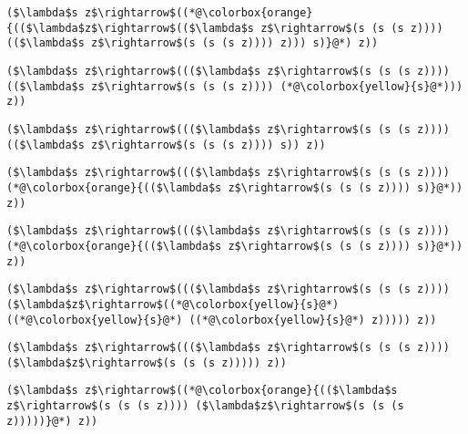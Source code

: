 \documentclass{beamer}
\begin{document}
\begin{frame}[fragile]{\CurrentSection}
\lstset{basicstyle=\ttfamily\small}\lstset{numbers=none}\lstset{language=ML}\begin{lstlisting}
($\lambda$s z$\rightarrow$((*@\colorbox{orange}{(($\lambda$z$\rightarrow$(($\lambda$s z$\rightarrow$(s (s (s z)))) (($\lambda$s z$\rightarrow$(s (s (s z)))) z))) s)}@*) z))
\end{lstlisting}
\pause\lstset{language=ML}\begin{lstlisting}
($\lambda$s z$\rightarrow$((($\lambda$s z$\rightarrow$(s (s (s z)))) (($\lambda$s z$\rightarrow$(s (s (s z)))) (*@\colorbox{yellow}{s}@*))) z))
\end{lstlisting}

\end{frame}

\begin{frame}[fragile]{\CurrentSection}
\lstset{basicstyle=\ttfamily\small}\lstset{numbers=none}\lstset{language=ML}\begin{lstlisting}
($\lambda$s z$\rightarrow$((($\lambda$s z$\rightarrow$(s (s (s z)))) (($\lambda$s z$\rightarrow$(s (s (s z)))) s)) z))
\end{lstlisting}
\pause\lstset{language=ML}\begin{lstlisting}
($\lambda$s z$\rightarrow$((($\lambda$s z$\rightarrow$(s (s (s z)))) (*@\colorbox{orange}{(($\lambda$s z$\rightarrow$(s (s (s z)))) s)}@*)) z))
\end{lstlisting}

\end{frame}

\begin{frame}[fragile]{\CurrentSection}
\lstset{basicstyle=\ttfamily\small}\lstset{numbers=none}\lstset{language=ML}\begin{lstlisting}
($\lambda$s z$\rightarrow$((($\lambda$s z$\rightarrow$(s (s (s z)))) (*@\colorbox{orange}{(($\lambda$s z$\rightarrow$(s (s (s z)))) s)}@*)) z))
\end{lstlisting}
\pause\lstset{language=ML}\begin{lstlisting}
($\lambda$s z$\rightarrow$((($\lambda$s z$\rightarrow$(s (s (s z)))) ($\lambda$z$\rightarrow$((*@\colorbox{yellow}{s}@*) ((*@\colorbox{yellow}{s}@*) ((*@\colorbox{yellow}{s}@*) z))))) z))
\end{lstlisting}

\end{frame}

\begin{frame}[fragile]{\CurrentSection}
\lstset{basicstyle=\ttfamily\small}\lstset{numbers=none}\lstset{language=ML}\begin{lstlisting}
($\lambda$s z$\rightarrow$((($\lambda$s z$\rightarrow$(s (s (s z)))) ($\lambda$z$\rightarrow$(s (s (s z))))) z))
\end{lstlisting}
\pause\lstset{language=ML}\begin{lstlisting}
($\lambda$s z$\rightarrow$((*@\colorbox{orange}{(($\lambda$s z$\rightarrow$(s (s (s z)))) ($\lambda$z$\rightarrow$(s (s (s z)))))}@*) z))
\end{lstlisting}

\end{frame}
\end{document}
